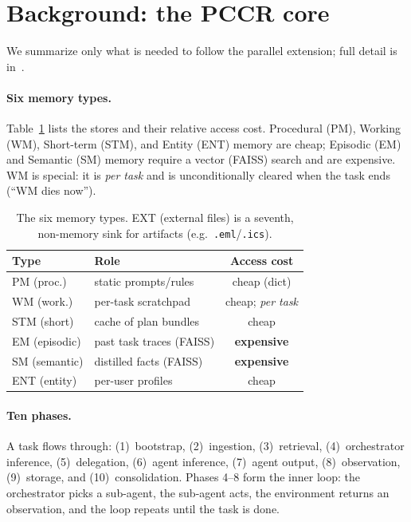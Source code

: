 \documentclass[10pt,twocolumn]{article}
\newcommand{\code}[1]{\texttt{\small #1}}
\begin{document}
\section{Background: the PCCR core}\label{sec:background}
We summarize only what is needed to follow the parallel extension; full detail
is in~\cite{pccr}.

\paragraph{Six memory types.} Table~\ref{tab:types} lists the stores and their
relative access cost. Procedural (PM), Working (WM), Short-term (STM), and
Entity (ENT) memory are cheap; Episodic (EM) and Semantic (SM) memory require a
vector (FAISS) search and are expensive. WM is special: it is \emph{per task}
and is unconditionally cleared when the task ends (``WM dies now'').

\begin{table}[t]
\centering\small
\begin{tabular}{@{}llc@{}}
\toprule
Type & Role & Access cost \\
\midrule
PM (proc.)    & static prompts/rules        & cheap (dict) \\
WM (work.)    & per-task scratchpad         & cheap; \emph{per task} \\
STM (short)   & cache of plan bundles       & cheap \\
EM (episodic) & past task traces (FAISS)    & \textbf{expensive} \\
SM (semantic) & distilled facts (FAISS)     & \textbf{expensive} \\
ENT (entity)  & per-user profiles           & cheap \\
\bottomrule
\end{tabular}
\caption{The six memory types. EXT (external files) is a seventh, non-memory
sink for artifacts (e.g.\ \code{.eml}/\code{.ics}).}
\label{tab:types}
\end{table}

\paragraph{Ten phases.} A task flows through:
(1)~bootstrap, (2)~ingestion, (3)~retrieval, (4)~orchestrator inference,
(5)~delegation, (6)~agent inference, (7)~agent output, (8)~observation,
(9)~storage, and (10)~consolidation. Phases 4--8 form the inner loop:
the orchestrator picks a sub-agent, the sub-agent acts, the environment
returns an observation, and the loop repeats until the task is done.
\end{document}
